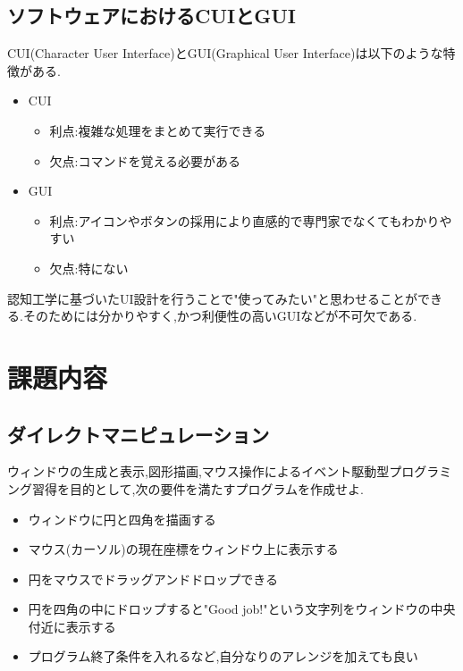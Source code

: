 \documentclass{jarticle}
\begin{document}
	\subsection{ソフトウェアにおけるCUIとGUI}

	CUI(Character User Interface)とGUI(Graphical User Interface)は以下のような特徴がある.
	\begin{itemize}
	\item CUI
		\begin{itemize}
		\item 利点:複雑な処理をまとめて実行できる
		\item 欠点:コマンドを覚える必要がある
		\end{itemize}
	\item GUI
		\begin{itemize}
		\item 利点:アイコンやボタンの採用により直感的で専門家でなくてもわかりやすい 
		\item 欠点:特にない
		\end{itemize}
	\end{itemize}
	認知工学に基づいたUI設計を行うことで"使ってみたい"と思わせることができる.そのためには分かりやすく,かつ利便性の高いGUIなどが不可欠である.


	\section{課題内容}
	\subsection{ダイレクトマニピュレーション}
	\label{subsec:kadai1}
	ウィンドウの生成と表示,図形描画,マウス操作によるイベント駆動型プログラミング習得を目的として,次の要件を満たすプログラムを作成せよ.

	\begin{itemize}

	\item ウィンドウに円と四角を描画する
	\item マウス(カーソル)の現在座標をウィンドウ上に表示する
	\item 円をマウスでドラッグアンドドロップできる
	\item 円を四角の中にドロップすると"Good job!"という文字列をウィンドウの中央付近に表示する
	\item プログラム終了条件を入れるなど,自分なりのアレンジを加えても良い

	\end{itemize}
\end{document}
